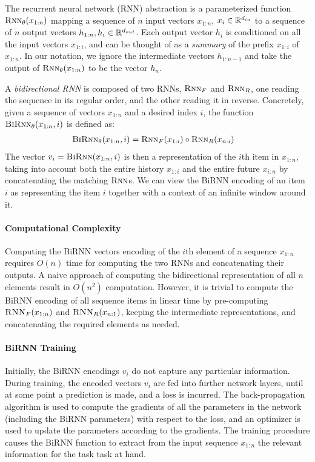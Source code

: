 \documentclass[11pt]{article}
\begin{document}
The recurrent neural network (RNN) abstraction is a parameterized function
$\textsc{Rnn}_\theta(x_{1:n})$
mapping a sequence of $n$ input vectors $x_{1:n}$, $x_i \in \mathbb{R}^{d_{in}}$ to a
sequence of $n$ output vectors $h_{1:n}, h_i \in \mathbb{R}^{d_{out}}$.  Each output vector $h_i$ is conditioned
on all the input vectors $x_{1:i}$, and can be thought of as a \emph{summary} of
the prefix $x_{1:i}$ of $x_{1:n}$.  In our notation, we ignore the intermediate
vectors $h_{1:{n-1}}$ and take the output of $\textsc{Rnn}_\theta(x_{1:n})$ to
be the vector $h_n$.

A \emph{bidirectional RNN} is composed of two RNNs, $\textsc{Rnn}_{F}$ and
$\textsc{Rnn}_{R}$, one
reading the sequence in its regular order, and the other reading it in reverse.
Concretely, given a sequence of vectors $x_{1:n}$ and a desired index $i$, the function
$\textsc{BiRnn}_{\theta}(x_{1:n}, i)$ is defined as:
\begin{align*}
    \textsc{BiRnn}_{\theta}(x_{1:n},i) &= \textsc{Rnn}_{F}(x_{1:i}) \circ
    \textsc{Rnn}_{R}(x_{n:i})
\end{align*}
The vector $v_i = \textsc{BiRnn}(x_{1:n}, i)$ is then a representation of the $i$th item
in $x_{1:n}$, taking into account both the entire history $x_{1:i}$ and the
entire future $x_{i:n}$ by concatenating the matching $\textsc{Rnn}$s.  We can view the BiRNN encoding of an item $i$ as
representing the item $i$ together with a context of an infinite window around
it.

\paragraph{Computational Complexity}
Computing the BiRNN vectors encoding of the $i$th element of a sequence
$x_{1:n}$ requires $O(n)$ time for computing the two RNNs and concatenating
their outputs.  A naive approach of computing the bidirectional
representation of all $n$ elements result in $O(n^2)$ computation.
However, it is trivial to compute the BiRNN encoding of all sequence items in
linear time by pre-computing $\textsc{RNN}_F(x_{1:n})$ and
$\textsc{RNN}_R(x_{n:1})$, keeping the intermediate representations, and
concatenating the required elements as needed.

\paragraph{BiRNN Training}
Initially, the BiRNN encodings $v_i$ do not capture any particular information.
During training, the encoded vectors $v_i$ are fed into further network layers,
until at some point a prediction is made, and a loss is incurred. The
back-propagation algorithm is used to compute the gradients of all the
parameters in the network (including the BiRNN parameters) with respect to the
loss, and an optimizer is used to update the parameters according to the
gradients. The training procedure causes the BiRNN function to extract from the
input sequence $x_{1:n}$ the relevant information for the task task at hand.
\end{document}
